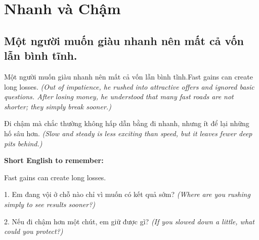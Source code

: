 \chapter{Nhanh và Chậm}

\section{Một người muốn giàu nhanh nên mất cả vốn lẫn bình tĩnh.}
\begin{truyen}{Một người muốn giàu nhanh nên mất cả vốn lẫn bình tĩnh.}{Fast gains can create long losses.}
\textit{(Out of impatience, he rushed into attractive offers and ignored basic questions. After losing money, he understood that many fast roads are not shorter; they simply break sooner.)}
\end{truyen}
\begin{baihoc}
Đi chậm mà chắc thường không hấp dẫn bằng đi nhanh, nhưng ít để lại những hố sâu hơn.
\textit{(Slow and steady is less exciting than speed, but it leaves fewer deep pits behind.)}
\end{baihoc}
\begin{ghinhoanh}
\textbf{Short English to remember:}

Fast gains can create long losses.
\end{ghinhoanh}
\begin{tuhocnhanh}
1. Em đang vội ở chỗ nào chỉ vì muốn có kết quả sớm? \textit{(Where are you rushing simply to see results sooner?)}

2. Nếu đi chậm hơn một chút, em giữ được gì? \textit{(If you slowed down a little, what could you protect?)}
\end{tuhocnhanh}
\ngancach

